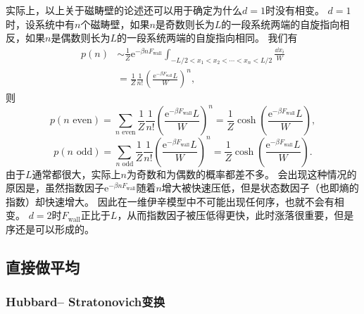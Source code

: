 \documentclass[hyperref, UTF8, a4paper]{ctexart}
\newcommand*{\ee}{\mathrm{e}}
\begin{document}
实际上，以上关于磁畴壁的论述还可以用于确定为什么$d=1$时没有相变。
$d=1$时，设系统中有$n$个磁畴壁，如果$n$是奇数则长为$L$的一段系统两端的自旋指向相反，如果$n$是偶数则长为$L$的一段系统两端的自旋指向相同。
我们有
\[
    \begin{aligned}
        p(n) &\sim \frac{1}{Z} \ee^{-\beta n F_\text{wall}} \int_{-L/2<x_1<x_2<\cdots<x_n<L/2} \frac{\dd{x_i}}{W} \\
        &= \frac{1}{Z} \frac{1}{n!} \left( \frac{\ee^{-\beta F_\text{wall}} L}{W} \right)^n,
    \end{aligned}
\]
则
\[
    p(\text{$n$ even}) = \sum_{\text{$n$ even}} \frac{1}{Z} \frac{1}{n!} \left( \frac{\ee^{-\beta F_\text{wall}} L}{W} \right)^n = \frac{1}{Z} \cosh(\frac{\ee^{-\beta F_\text{wall}} L}{W}),
\]
\[
    p(\text{$n$ odd}) = \sum_{\text{$n$ odd}} \frac{1}{Z} \frac{1}{n!} \left( \frac{\ee^{-\beta F_\text{wall}} L}{W} \right)^n = \frac{1}{Z} \cosh(\frac{\ee^{-\beta F_\text{wall}} L}{W}).
\]
由于$L$通常都很大，实际上$n$为奇数和为偶数的概率都差不多。
会出现这种情况的原因是，虽然指数因子$\ee^{-\beta n F_\text{wall}}$随着$n$增大被快速压低，但是状态数因子（也即熵的指数）却快速增大。
因此在一维伊辛模型中不可能出现任何序，也就不会有相变。
$d=2$时$F_\text{wall}$正比于$L$，从而指数因子被压低得更快，此时涨落很重要，但是序还是可以形成的。

\subsection{直接做平均}\label{sec:ab-initio-effective-theory}

\subsubsection{Hubbard–
Stratonovich变换}
\end{document}

